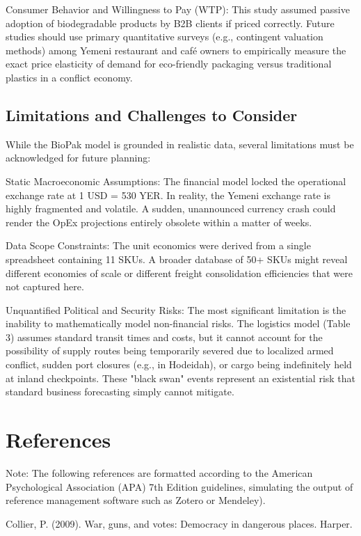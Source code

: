 \documentclass[12pt,a4paper]{article}
\begin{document}
Consumer Behavior and Willingness to Pay (WTP): This study assumed passive adoption of biodegradable products by B2B clients if priced correctly. Future studies should use primary quantitative surveys (e.g., contingent valuation methods) among Yemeni restaurant and café owners to empirically measure the exact price elasticity of demand for eco-friendly packaging versus traditional plastics in a conflict economy.

\subsection{Limitations and Challenges to Consider}

While the BioPak model is grounded in realistic data, several limitations must be acknowledged for future planning:

Static Macroeconomic Assumptions: The financial model locked the operational exchange rate at 1 USD = 530 YER. In reality, the Yemeni exchange rate is highly fragmented and volatile. A sudden, unannounced currency crash could render the OpEx projections entirely obsolete within a matter of weeks.

Data Scope Constraints: The unit economics were derived from a single spreadsheet containing 11 SKUs. A broader database of 50+ SKUs might reveal different economies of scale or different freight consolidation efficiencies that were not captured here.

Unquantified Political and Security Risks: The most significant limitation is the inability to mathematically model non-financial risks. The logistics model (Table 3) assumes standard transit times and costs, but it cannot account for the possibility of supply routes being temporarily severed due to localized armed conflict, sudden port closures (e.g., in Hodeidah), or cargo being indefinitely held at inland checkpoints. These "black swan" events represent an existential risk that standard business forecasting simply cannot mitigate.

\section{References}

Note: The following references are formatted according to the American Psychological Association (APA) 7th Edition guidelines, simulating the output of reference management software such as Zotero or Mendeley).

Collier, P. (2009). War, guns, and votes: Democracy in dangerous places. Harper.
\end{document}
